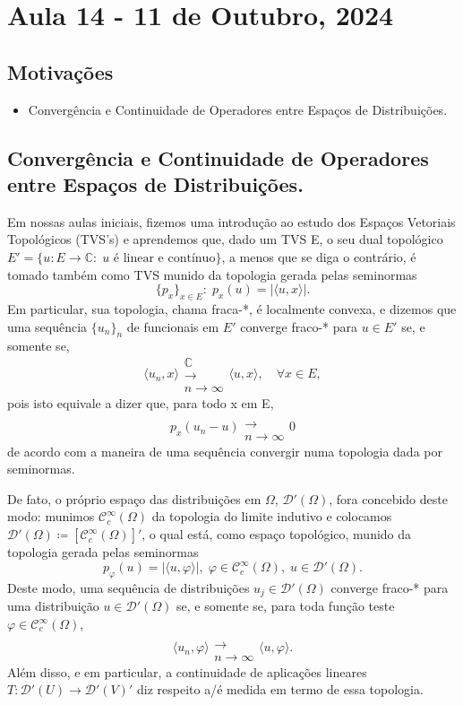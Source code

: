 \documentclass[../distribution_theory_notes.tex]{subfiles}
\begin{document}
\section{Aula 14 - 11 de Outubro, 2024}
\subsection{Motivações}
\begin{itemize}
	\item Convergência e Continuidade de Operadores entre Espaços de Distribuições.
\end{itemize}
\subsection{Convergência e Continuidade de Operadores entre Espaços de Distribuições.}
Em nossas aulas iniciais, fizemos uma introdução ao estudo dos Espaços Vetoriais Topológicos (TVS's) e aprendemos que, dado um TVS E, o seu dual topológico \(E'=\{u:E\rightarrow \mathbb{C}:\; u \text{ é linear e contínuo}\}\), a menos que se diga o contrário, é tomado também como TVS munido da topologia gerada pelas seminormas
\[
	\{p_x\}_{x\in E}:\; p_x(u) = | \langle u, x \rangle |.
\]
Em particular, sua topologia, chama fraca-*, é localmente convexa, e dizemos que uma sequência \(\{u_{n}\}_{n}\) de funcionais em \(E'\) converge fraco-* para \(u\in E'\) se, e somente se,
\[
	\langle u_{n}, x \rangle\substack{\mathbb{C} \\ \longrightarrow \\ n\to \infty}\langle u, x \rangle, \quad \forall x\in E,
\]
pois isto equivale a dizer que, para todo x em E,
\[
	p_x(u_{n}-u)\substack{ \\ \longrightarrow \\ n\to \infty}0
\]
de acordo com a maneira de uma sequência convergir numa topologia dada por seminormas.

De fato, o próprio espaço das distribuições em \(\Omega \), \(\mathcal{D}'(\Omega )\), fora concebido deste modo: munimos \(\mathcal{C}_{c}^{\infty}(\Omega )\) da topologia do limite indutivo e colocamos \(\mathcal{D}'(\Omega ) \coloneqq [\mathcal{C}_{c}^{\infty}(\Omega )]'\), o qual está, como espaço topológico, munido da topologia gerada pelas seminormas
\[
	p_\varphi (u) = | \langle u, \varphi  \rangle |,\; \varphi \in \mathcal{C}_{c}^{\infty}(\Omega ),\; u\in \mathcal{D}'(\Omega ).
\]
Deste modo, uma sequência de distribuições \(u_{j}\in \mathcal{D}'(\Omega )\) converge fraco-* para uma distribuição \(u\in \mathcal{D}'(\Omega )\) se, e somente se, para toda função teste \(\varphi \in \mathcal{C}_{c}^{\infty}(\Omega )\),
\[
	\langle u_{n}, \varphi  \rangle \substack{ \\ \longrightarrow \\ n\to \infty} \langle u, \varphi  \rangle.
\]
Além disso, e em particular, a continuidade de aplicações lineares \(T:\mathcal{D}'(U)\rightarrow \mathcal{D}'(V)'\) diz respeito a/é medida em termo de essa topologia.
\end{document}
